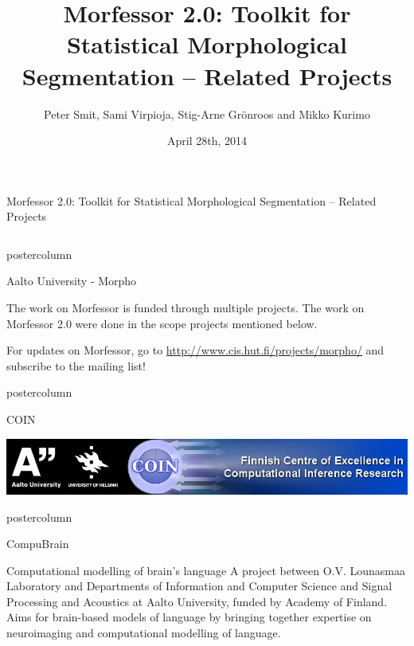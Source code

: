 \documentclass[final]{beamer} %
\title{Morfessor 2.0: Toolkit for Statistical Morphological Segmentation -- Related Projects}
\author{Peter Smit, Sami Virpioja, Stig-Arne Gr\"onroos and Mikko Kurimo}
\institute[Aalto University]{Aalto University}
\date{April 28th, 2014}
\begin{document}
  \begin{frame}{Morfessor 2.0: Toolkit for Statistical Morphological Segmentation -- Related Projects} 
\begin{columns}



\begin{column}{.49\textwidth}
  \begin{beamercolorbox}[center,wd=\textwidth]{postercolumn}
 \begin{block}{Aalto University  - Morpho}

The work on Morfessor is funded through multiple projects. The work on Morfessor 2.0 were done in the scope projects mentioned below.

For updates on Morfessor, go to  \url{http://www.cis.hut.fi/projects/morpho/}  and subscribe to the mailing list!

%


            \end{block}
            
	\end{beamercolorbox}
\vfill

  \begin{beamercolorbox}[center,wd=\textwidth]{postercolumn}
 \begin{block}{COIN}
\vspace{1cm}

              \includegraphics[width=\textwidth]{coinbanner}            
            \end{block}
            
	\end{beamercolorbox}
\vfill


  \begin{beamercolorbox}[center,wd=\textwidth]{postercolumn}
 \begin{block}{CompuBrain}

Computational modelling of brain's language
A project between O.V. Lounasmaa Laboratory and Departments of
Information and Computer Science and Signal Processing and
 Acoustics at Aalto University, funded by Academy of Finland. Aims
 for brain-based models of language by bringing together expertise
 on neuroimaging and computational modelling of language.
            \end{block}
            

\end{beamercolorbox}
\end{column}
\end{columns}
\end{frame}
\end{document}
